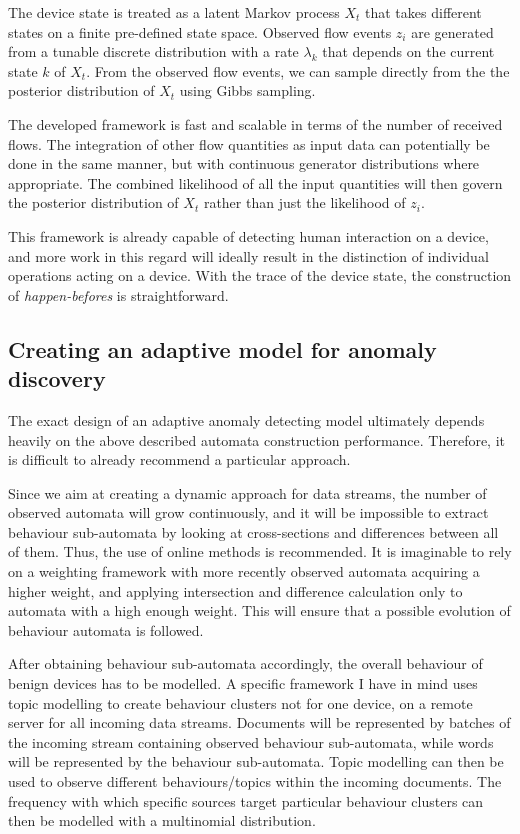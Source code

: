 \documentclass[a4paper,12pt,twoside]{report}
\begin{document}
The device state is treated as a latent Markov process $X_t$ that takes different states on a finite pre-defined state space. Observed flow events $z_i$ are generated from a tunable discrete distribution with a rate $\lambda_k$ that depends on the current state $k$ of $X_t$. From the observed flow events, we can sample directly from the the posterior distribution of $X_t$ using Gibbs sampling. 

The developed framework is fast and scalable in terms of the number of received flows. The integration of other flow quantities as input data can potentially be done in the same manner, but with continuous generator distributions where appropriate. The combined likelihood of all the input quantities will then govern the posterior distribution of $X_t$ rather than just the likelihood of $z_i$.

This framework is already capable of detecting human interaction on a device, and more work in this regard will ideally result in the distinction of individual operations acting on a device. With the trace of the device state, the construction of \textit{happen-befores} is straightforward.  

\subsection{Creating an adaptive model for anomaly discovery}

The exact design of an adaptive anomaly detecting model ultimately depends heavily on the above described automata construction performance. Therefore, it is difficult to already recommend a particular approach. 

Since we aim at creating a dynamic approach for data streams, the number of observed automata will grow continuously, and it will be impossible to extract behaviour sub-automata by looking at cross-sections and differences between all of them. Thus, the use of online methods is recommended. It is imaginable to rely on a weighting framework with more recently observed automata acquiring a higher weight, and applying intersection and difference calculation only to automata with a high enough weight. This will ensure that a possible evolution of behaviour automata is followed.


After obtaining behaviour sub-automata accordingly, the overall behaviour of benign devices has to be modelled. A specific framework I have in mind uses topic modelling to create behaviour clusters not for one device, on a remote server for all incoming data streams. Documents will be represented by batches of the incoming stream containing observed behaviour sub-automata, while words will be represented by the behaviour sub-automata. Topic modelling can then be used to observe different behaviours/topics within the incoming documents. The frequency with which specific sources target particular behaviour clusters can then be modelled with a multinomial distribution.
\end{document}
